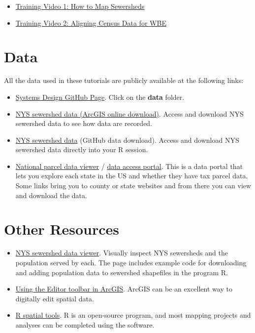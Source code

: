 \documentclass[
]{book}
\begin{document}
\begin{itemize}
\item
  \href{https://www.youtube.com/watch?v=XU9Ux8cMIJk}{Training Video 1: How to Map Sewersheds}
\item
  \href{https://www.youtube.com/watch?v=b5r3dtrzZNc}{Training Video 2: Aligning Census Data for WBE}
\end{itemize}

\section{Data}\label{data}

All the data used in these tutorials are publicly available at the following links:

\begin{itemize}
\item
  \href{https://github.com/nys-wwsn/Systems-Design-Bookdown}{Systems Design GitHub Page}. Click on the \textbf{data} folder.
\item
  \href{https://www.arcgis.com/home/item.html?id=e795007660ae4a1fae5f86b40d065b3a}{NYS sewershed data (ArcGIS online download)}. Access and download NYS sewershed data to see how data are recorded.
\item
  \href{https://github.com/nys-wwsn/ny-sewer-spatial-data}{NYS sewershed data} (GitHub data download). Access and download NYS sewershed data directly into your R session.
\item
  \href{https://www.arcgis.com/apps/mapviewer/index.html?url=https://services5.arcgis.com/fmKivMCp6fwbWbeE/ArcGIS/rest/services/2023_NSGIC_Parcel_Portal/FeatureServer&source=sd}{National parcel data viewer} / \href{https://services5.arcgis.com/fmKivMCp6fwbWbeE/ArcGIS/rest/services/2023_NSGIC_Parcel_Portal/FeatureServer}{data access portal}. This is a data portal that lets you explore each state in the US and whether they have tax parcel data. Some links bring you to county or state websites and from there you can view and download the data.
\end{itemize}

\section{Other Resources}\label{other-resources}

\begin{itemize}
\item
  \href{https://dthill196.github.io/NY-Sewershed-Populations/}{NYS sewershed data viewer}. Visually inspect NYS sewersheds and the population served by each. The page includes example code for downloading and adding population data to sewershed shapefiles in the program R.
\item
  \href{https://desktop.arcgis.com/en/arcmap/latest/manage-data/editing-fundamentals/adding-the-editor-toolbar.htm}{Using the Editor toolbar in ArcGIS}. ArcGIS can be an excellent way to digitally edit spatial data.
\item
  \href{https://r-spatial.org/}{R spatial tools}. R is an open-source program, and most mapping projects and analyses can be completed using the software.
\end{itemize}
\end{document}
